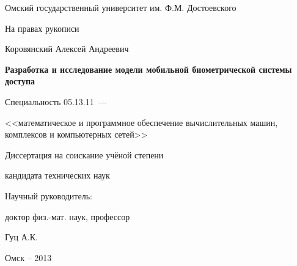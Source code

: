 \thispagestyle{empty}

\begin{center}
Омский государственный университет им. Ф.М. Достоевского
\par
\end{center}

\vspace{20mm}
\begin{flushright}
На правах рукописи

\end{flushright}

\vspace{30mm}
\begin{center}
{\large Коровянский Алексей Андреевич}
\end{center}

\vspace{5mm}
\begin{center}
{\bf \large Разработка и исследование модели мобильной биометрической системы доступа
\par}

\vspace{10mm}
{%
Специальность 05.13.11~---

<<математическое и программное обеспечение вычислительных машин, комплексов и компьютерных сетей>>
}

\vspace{10mm}
Диссертация на соискание учёной степени

кандидата технических наук
\end{center}

\vspace{20mm}
\begin{flushright}
Научный руководитель:

доктор физ.-мат. наук, профессор

Гуц А.К.

\end{flushright}

\vspace{20mm}
\begin{center}
{Омск -- 2013}
\end{center}

\newpage